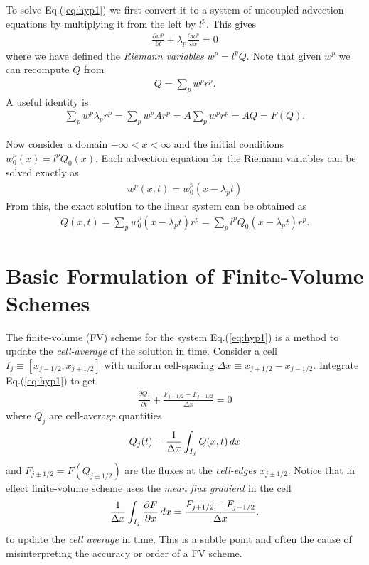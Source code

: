 \documentclass[12pt]{article}
\theoremstyle{definition}
\theoremstyle{definition}
\theoremstyle{definition}
\newcommand{\eqr}[1]{Eq.\thinspace(#1)}
\newcommand{\pfrac}[2]{\frac{\partial #1}{\partial #2}}
\begin{document}
To solve \eqr{\ref{eq:hyp1}} we first convert it to a system of
uncoupled advection equations by multiplying it from the left by
$l^p$. This gives
\begin{align}
\pfrac{w^p}{t} + \lambda_p \pfrac{w^p}{x} = 0 \label{eq:wp-advect}
\end{align}
where we have defined the \emph{Riemann variables} $w^p = l^p Q$. Note
that given $w^p$ we can recompute $Q$ from
\begin{align}
Q = \sum_p w^p r^p. \label{eq:wp-to-Q}
\end{align}
A useful identity is
\begin{align}
\sum_p w^p \lambda_p r^p = \sum_p w^p A r^p = A \sum_p w^p r^p = AQ = F(Q). \label{eq:wp-ident1}
\end{align}

Now consider a domain $-\infty < x < \infty$ and the initial
conditions $w^p_0(x) = l^p Q_0(x)$. Each advection equation for the
Riemann variables can be solved exactly as
\begin{align}
w^p(x,t) = w^p_0(x-\lambda_p t)
\end{align}
From this, the exact solution to the linear system can be obtained as
\begin{align}
Q(x,t) = \sum_p w^p_0(x-\lambda_p t) r^p = \sum_p l^p Q_0(x-\lambda_p t) r^p.
\end{align}

\section{Basic Formulation of Finite-Volume Schemes}

The finite-volume (FV) scheme for the system \eqr{\ref{eq:hyp1}} is a
method to update the \emph{cell-average} of the solution in
time. Consider a cell $I_j \equiv [x_{j-1/2},x_{j+1/2}]$ with uniform
cell-spacing $\Delta x \equiv x_{j+1/2}-x_{j-1/2}$. Integrate
\eqr{\ref{eq:hyp1}} to get
\begin{align}
  \pfrac{Q_j}{t} + \frac{F_{j+1/2}-F_{j-1/2}}{\Delta x} = 0
  \label{eq:fv-exact}
\end{align}
where $Q_j$ are cell-average quantities
\begin{align}
  Q_j(t) = \frac{1}{\Delta x}\int_{I_j} Q(x,t) \thinspace dx
\end{align}
and $F_{j\pm 1/2} = F(Q_{j\pm 1/2})$ are the fluxes at the
\emph{cell-edges} $x_{j\pm 1/2}$. Notice that in effect finite-volume
scheme uses the \emph{mean flux gradient} in the cell
\begin{align}
  \frac{1}{\Delta x}\int_{I_j} \pfrac{F}{x} \thinspace dx =
  \frac{F_{j+1/2}-F_{j-1/2}}{\Delta x}.
\end{align}
to update the \emph{cell average} in time. This is a subtle point and
often the cause of misinterpreting the accuracy or order of a FV
scheme.
\end{document}

